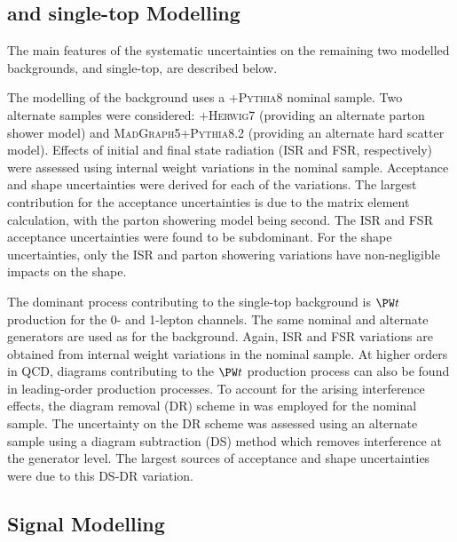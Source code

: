 \subsection{\texorpdfstring{\ttbar}{ttbar} and single-top Modelling}

The main features of the systematic uncertainties on the remaining two modelled backgrounds, \ttbar and single-top, are described below.

The modelling of the \ttbar background uses a \POWHEG{}+\textsc{Pythia8} nominal sample.
Two alternate samples were considered: \POWHEG{}+\textsc{Herwig7} (providing an alternate parton shower model) and \textsc{MadGraph5+Pythia8.2} (providing an alternate hard scatter model).
Effects of initial and final state radiation (ISR and FSR, respectively) were assessed using internal weight variations in the nominal sample.
Acceptance and shape uncertainties were derived for each of the variations.
The largest contribution for the acceptance uncertainties is due to the matrix element calculation, with the parton showering model being second.
The ISR and FSR acceptance uncertainties were found to be subdominant.
For the shape uncertainties, only the ISR and parton showering variations have non-negligible impacts on the \mJ shape.

The dominant process contributing to the single-top background is $\Wboson t$ production for the 0- and 1-lepton channels.
The same nominal and alternate generators are used as for the \ttbar background.
Again, ISR and FSR variations are obtained from internal weight variations in the nominal sample.
At higher orders in QCD, diagrams contributing to the $\Wboson t$ production process can also be found in leading-order \ttbar
production processes.
To account for the arising interference effects, the diagram removal (DR) scheme in  was employed for the nominal sample.
The uncertainty on the DR scheme was assessed using an alternate sample using a diagram subtraction (DS) method which removes interference at the generator level.
The largest sources of acceptance and shape uncertainties were due to this DS-DR variation.


\subsection{Signal Modelling}

